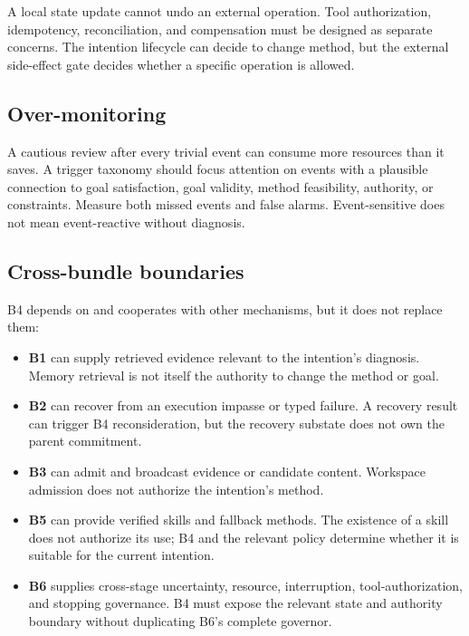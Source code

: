 A local state update cannot undo an external operation. Tool authorization, idempotency, reconciliation, and compensation must be designed as separate concerns. The intention lifecycle can decide to change method, but the external side-effect gate decides whether a specific operation is allowed.

\subsection{Over-monitoring}

A cautious review after every trivial event can consume more resources than it saves. A trigger taxonomy should focus attention on events with a plausible connection to goal satisfaction, goal validity, method feasibility, authority, or constraints. Measure both missed events and false alarms. Event-sensitive does not mean event-reactive without diagnosis.

\subsection{Cross-bundle boundaries}

B4 depends on and cooperates with other mechanisms, but it does not replace them:

\begin{itemize}
  \item \textbf{B1} can supply retrieved evidence relevant to the intention's diagnosis. Memory retrieval is not itself the authority to change the method or goal.
  \item \textbf{B2} can recover from an execution impasse or typed failure. A recovery result can trigger B4 reconsideration, but the recovery substate does not own the parent commitment.
  \item \textbf{B3} can admit and broadcast evidence or candidate content. Workspace admission does not authorize the intention's method.
  \item \textbf{B5} can provide verified skills and fallback methods. The existence of a skill does not authorize its use; B4 and the relevant policy determine whether it is suitable for the current intention.
  \item \textbf{B6} supplies cross-stage uncertainty, resource, interruption, tool-authorization, and stopping governance. B4 must expose the relevant state and authority boundary without duplicating B6's complete governor.
\end{itemize}

